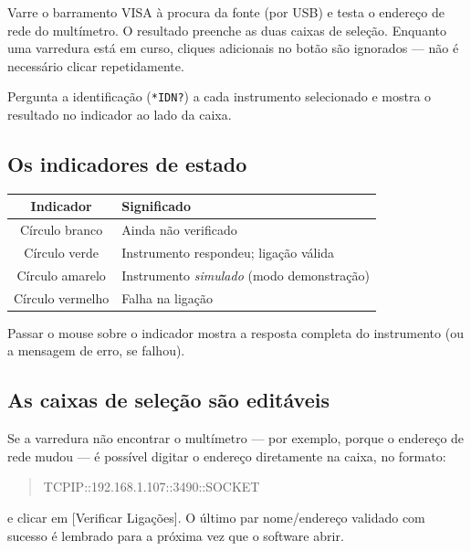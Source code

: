 \documentclass[11pt,a4paper]{article}
\newcommand{\botao}[1]{\textsf{[#1]}}
\begin{document}
\begin{description}[style=nextline,leftmargin=0.6cm]
  \item[\botao{Procurar Instrumentos}]
    Varre o barramento VISA à procura da fonte (por USB) e testa o endereço de
    rede do multímetro. O resultado preenche as duas caixas de seleção.
    Enquanto uma varredura está em curso, cliques adicionais no botão são
    ignorados --- não é necessário clicar repetidamente.

  \item[\botao{Verificar Ligações}]
    Pergunta a identificação (\texttt{*IDN?}) a cada instrumento selecionado e
    mostra o resultado no indicador ao lado da caixa.
\end{description}

\subsection{Os indicadores de estado}

\begin{center}
\begin{tabular}{@{}cl@{}}
\toprule
\textbf{Indicador} & \textbf{Significado} \\
\midrule
Círculo branco & Ainda não verificado \\
Círculo verde & Instrumento respondeu; ligação válida \\
Círculo amarelo & Instrumento \emph{simulado} (modo demonstração) \\
Círculo vermelho & Falha na ligação \\
\bottomrule
\end{tabular}
\end{center}

Passar o mouse sobre o indicador mostra a resposta completa do instrumento (ou
a mensagem de erro, se falhou).

\subsection{As caixas de seleção são editáveis}

Se a varredura não encontrar o multímetro --- por exemplo, porque o endereço de
rede mudou --- é possível digitar o endereço diretamente na caixa, no formato:

\begin{quote}\ttfamily
TCPIP::192.168.1.107::3490::SOCKET
\end{quote}

e clicar em \botao{Verificar Ligações}. O último par nome/endereço validado com
sucesso é lembrado para a próxima vez que o software abrir.
\end{document}
